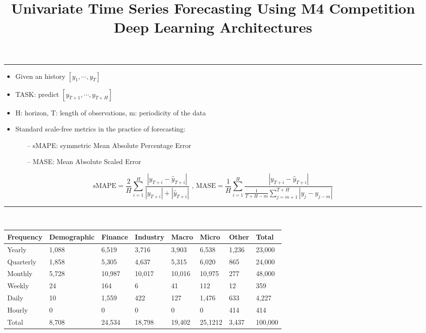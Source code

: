 \documentclass{article}
\title{Univariate Time Series Forecasting Using  M4 Competition Deep Learning Architectures}
\date{}
\begin{document}

\par\noindent\rule{\textwidth}{0.4pt}

\begin{itemize}
	\item Given an history $[ y_1, \cdots, y_T ]$
	\item TASK: predict $[y_{T+1}, \cdots , y_{T+H} ]$
	\item H: horizon, T: length of observations, m: periodicity of the data
	\item Standard scale-free metrics in the practice of forecasting:
	\begin{itemize}
			\item [--]  sMAPE: symmetric Mean Absolute Percentage Error
			\item [--]  MASE: Mean Absolute Scaled Error
	\end{itemize}
\end{itemize}

\[
	\text{sMAPE} = \frac{2}{H}  \sum_{i=1}^{H} \frac{ | y_{T+i}  - \hat{y}_{T+i} | } { | y_{T+i} | + | \hat{y}_{T+i} | } \text{ ,     } 
	\text{MASE} = \frac{1}{H}  \sum_{i=1}^{H} \frac{ | y_{T+i}  - \hat{y}_{T+i} | } { \frac{1} {T + H - m} \sum_{j=m+1}^{T+H}  | y_j  - y_{j-m} | }
\]

\par\noindent\rule{\textwidth}{0.4pt}\\[12pt]

\begin{table}[!ht]
	\centering
	\begin{tabular}{llllllll} \toprule
		\textbf{Frequency} & \textbf{Demographic} & \textbf{Finance} & \textbf{Industry} & \textbf{Macro} & \textbf{Micro} & \textbf{Other} & \textbf{Total}  \\ \midrule
		Yearly & 1,088 & 6,519 & 3,716 & 3,903 & 6,538 & 1,236 & 23,000 \\
		\midrule
		Quarterly & 1,858 & 5,305 & 4,637 & 5,315 & 6,020 & 865 & 24,000 \\
		\midrule
		Monthly & 5,728 & 10,987 & 10,017 & 10,016 & 10,975 & 277 & 48,000 \\
		\midrule		
		Weekly & 24 & 164 & 6 & 41 & 112 & 12 & 359 \\
		\midrule		
		Daily & 10 & 1,559 & 422 & 127 & 1,476 & 633 & 4,227 \\
		\midrule		
		Hourly & 0 & 0 & 0 & 0 & 0 & 414 & 414 \\
		\midrule		
		Total & 8,708 & 24,534 & 18,798 & 19,402 & 25,1212 & 3,437 & 100,000 \\
		 \bottomrule
	\end{tabular}
\end{table}
\end{document}
